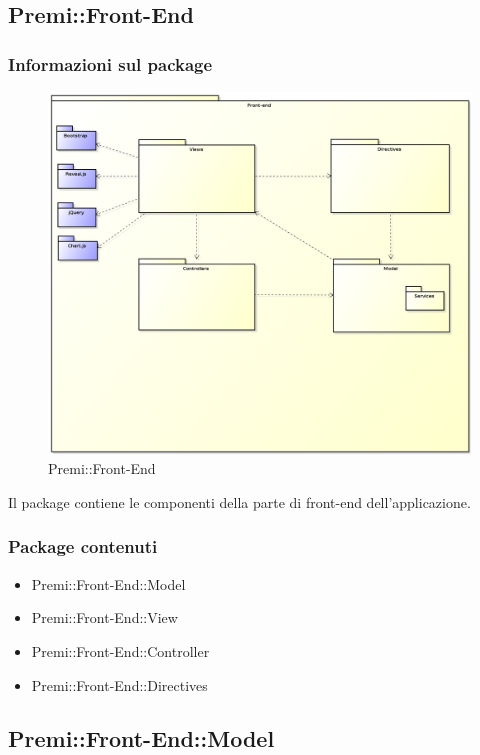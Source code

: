 \subsection{Premi::Front-End}
	\subsubsection{Informazioni sul package}
		\begin{figure}[h]
			\centering
			\includegraphics[width=\linewidth]{img/front-end-package}
			\caption[Premi::Front-End]{Premi::Front-End}
		\end{figure}
		Il package contiene le componenti della parte di front-end dell'applicazione.
	\subsubsection{Package contenuti}
		\begin{itemize}
			\item Premi::Front-End::Model
			\item Premi::Front-End::View
			\item Premi::Front-End::Controller
			\item Premi::Front-End::Directives
		\end{itemize}
\subsection{Premi::Front-End::Model}
